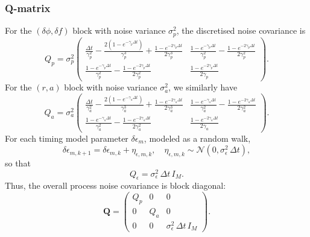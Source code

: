 \documentclass{tufte-handout} %
\begin{document}
	
\subsubsection{Q-matrix}
	
	For the $\left(\delta\phi,\delta f\right)$ block with noise variance $\sigma_p^2$, the discretised noise covariance is
	\begin{equation}
	Q_p = \sigma_p^2
	\begin{pmatrix}
		\displaystyle \frac{\Delta t}{\gamma_p^2} - \frac{2\left(1-e^{-\gamma_p\Delta t}\right)}{\gamma_p^3} + \frac{1-e^{-2\gamma_p\Delta t}}{2\gamma_p^3} & \displaystyle \frac{1-e^{-\gamma_p\Delta t}}{\gamma_p^2} - \frac{1-e^{-2\gamma_p\Delta t}}{2\gamma_p^2}\\[2mm]
		\displaystyle \frac{1-e^{-\gamma_p\Delta t}}{\gamma_p^2} - \frac{1-e^{-2\gamma_p\Delta t}}{2\gamma_p^2} & \displaystyle \frac{1-e^{-2\gamma_p\Delta t}}{2\gamma_p}
	\end{pmatrix}.
	\end{equation}
	For the $\left(r,a\right)$ block with noise variance $\sigma_a^2$, we similarly have
	\begin{equation}
	Q_a = \sigma_a^2
	\begin{pmatrix}
		\displaystyle \frac{\Delta t}{\gamma_a^2} - \frac{2\left(1-e^{-\gamma_a\Delta t}\right)}{\gamma_a^3} + \frac{1-e^{-2\gamma_a\Delta t}}{2\gamma_a^3} & \displaystyle \frac{1-e^{-\gamma_a\Delta t}}{\gamma_a^2} - \frac{1-e^{-2\gamma_a\Delta t}}{2\gamma_a^2}\\[2mm]
		\displaystyle \frac{1-e^{-\gamma_a\Delta t}}{\gamma_a^2} - \frac{1-e^{-2\gamma_a\Delta t}}{2\gamma_a^2} & \displaystyle \frac{1-e^{-2\gamma_a\Delta t}}{2\gamma_a}
	\end{pmatrix}.
	\end{equation}
	For each timing model parameter $\delta\epsilon_m$, modeled as a random walk,
	\begin{equation}
	\delta\epsilon_{m,k+1} = \delta\epsilon_{m,k} + \eta_{\epsilon,m,k}, \quad \eta_{\epsilon,m,k}\sim \mathcal{N}(0,\sigma_\epsilon^2\,\Delta t),
	\end{equation}
	so that
	\begin{equation}
	Q_\epsilon = \sigma_\epsilon^2\,\Delta t\,I_M.
	\end{equation}
	Thus, the overall process noise covariance is block diagonal:
	\begin{equation}
	\boldsymbol{Q} = \begin{pmatrix}
		Q_p & 0 & 0\\[2mm]
		0 & Q_a & 0\\[2mm]
		0 & 0 & \sigma_\epsilon^2\,\Delta t\,I_M
	\end{pmatrix}.
	\end{equation}
	
\end{document}
